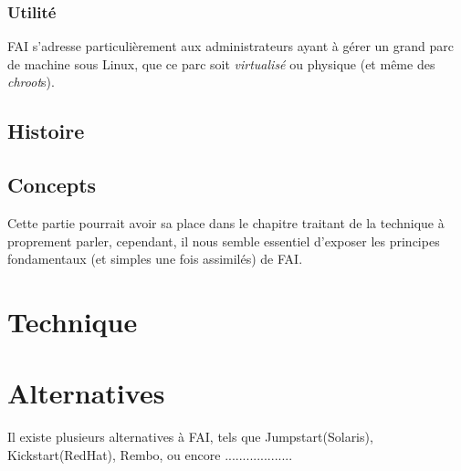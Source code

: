 \documentclass[a4paper,12pt,one side,titlepage]{report}
\begin{document}
\subsection{Utilité}
\textsc{FAI} s'adresse particulièrement aux administrateurs ayant à gérer un grand parc de machine sous Linux, que ce parc soit \textit{virtualisé} ou physique (et même des \textit{chroot}s).

\section{Histoire}


\section{Concepts}
Cette partie pourrait avoir sa place dans le chapitre traitant de la technique à proprement parler, cependant, il nous semble essentiel d'exposer les principes fondamentaux (et simples une fois assimilés) de \textsc{FAI}.



\chapter{Technique}

\chapter{Alternatives}
Il existe plusieurs alternatives à FAI, tels que Jumpstart(Solaris), Kickstart(RedHat), Rembo, ou encore ...................
\end{document}
